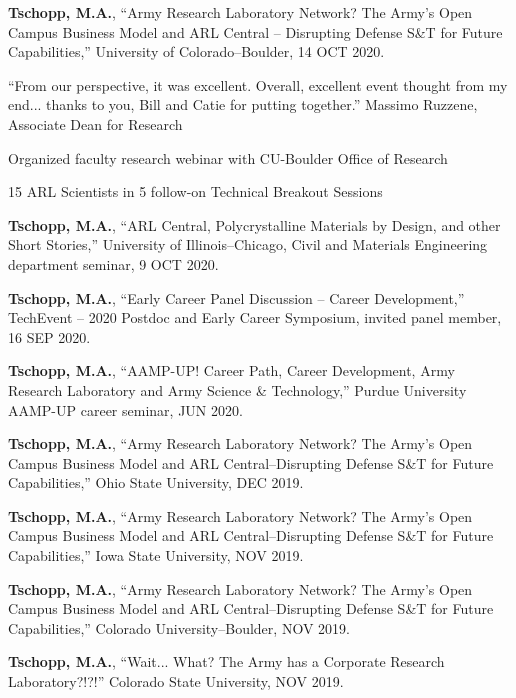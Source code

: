 \begin{cvlist}
\item
\textbf{Tschopp, M.A.}, ``Army Research Laboratory Network? The Army's Open Campus Business Model and ARL Central -- Disrupting Defense S\&T for Future Capabilities,'' University of Colorado--Boulder, 14 OCT 2020.
\begin{list2}
\item[$\star$] ``From our perspective, it was excellent. Overall, excellent event thought from my end...  thanks to you, Bill and Catie for putting together.'' Massimo Ruzzene, Associate Dean for Research
\item[$\star$] Organized faculty research webinar with CU-Boulder Office of Research
\item[$\star$] 15 ARL Scientists in 5 follow-on Technical Breakout Sessions
\end{list2}

\item
\textbf{Tschopp, M.A.}, ``ARL Central, Polycrystalline Materials by Design, and other Short Stories,'' University of Illinois--Chicago, Civil and Materials Engineering department seminar, 9 OCT 2020.

\item
\textbf{Tschopp, M.A.}, ``Early Career Panel Discussion -- Career Development,'' TechEvent -- 2020 Postdoc and Early Career Symposium, invited panel member, 16 SEP 2020.

\item
\textbf{Tschopp, M.A.}, ``AAMP-UP! Career Path, Career Development, Army Research Laboratory and Army Science \& Technology,'' Purdue University AAMP-UP career seminar, JUN 2020.

\item
\textbf{Tschopp, M.A.}, ``Army Research Laboratory Network? The Army's Open Campus Business Model and ARL Central--Disrupting Defense S\&T for Future Capabilities,'' Ohio State University, DEC 2019.

\item
\textbf{Tschopp, M.A.}, ``Army Research Laboratory Network? The Army's Open Campus Business Model and ARL Central--Disrupting Defense S\&T for Future Capabilities,'' Iowa State University, NOV 2019.

\item
\textbf{Tschopp, M.A.}, ``Army Research Laboratory Network? The Army's Open Campus Business Model and ARL Central--Disrupting Defense S\&T for Future Capabilities,'' Colorado University--Boulder, NOV 2019.

\item
\textbf{Tschopp, M.A.}, ``Wait... What? The Army has a Corporate Research Laboratory?!?!'' Colorado State University, NOV 2019.


\end{cvlist}
